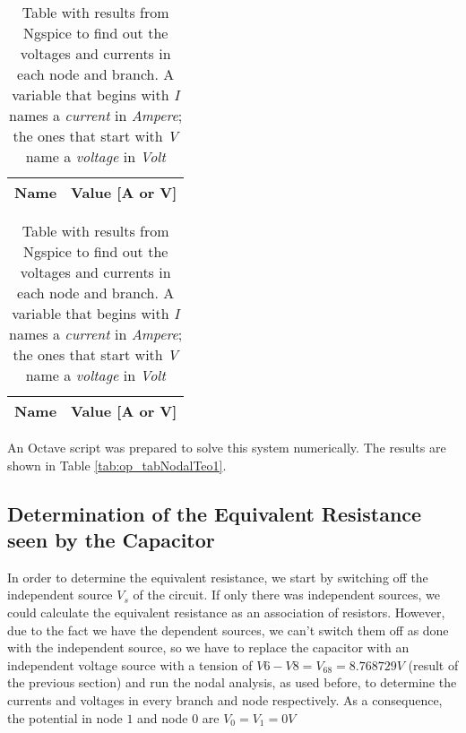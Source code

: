 \hfill

\begin{table}
  \parbox{.45\linewidth}{
    \centering
    \begin{tabular}{|c|c|}
      \hline
      {\bf Name} & {\bf Value [A or V]} \\ \hline
      
    \end{tabular}
    \label{tab:op_tabNodalTeo1}
    \caption{Results of Nodal Analysis of the circuit for t < 0. A variable that begins  with \textit{I} names a \textit{current} in \textit{Ampere}; the ones that start with \textit{V} name a \textit{voltage} in \textit{Volt}}
  }
  \hfill
  \parbox{.45\linewidth}{
    \centering
    \begin{tabular}{|c|c|}
      {\bf Name} & {\bf Value [A or V]} \\ \hline
      
      \hline
    \end{tabular}
    \label{tab:op_tabNodalSpice1}
    \caption{Table with results from Ngspice to find out the voltages and currents in each node and branch. A variable that begins  with \textit{I} names a \textit{current} in \textit{Ampere}; the ones that start with \textit{V} name a \textit{voltage} in \textit{Volt} }
  }
\end{table}



An Octave script was prepared to solve this system numerically. The results are shown in Table \ref{tab:op_tabNodalTeo1}.




\subsection{Determination of the Equivalent Resistance seen by the Capacitor}

In order to determine the equivalent resistance, we start by switching off the independent source $V_s$ of the circuit. If only there was independent sources, we could calculate the equivalent resistance
as an association of resistors. However, due to the fact we have the dependent sources, we can't switch them off as done with the independent source, so we have to replace the capacitor with an independent voltage source with a tension of $V6-V8 = V_{68} = 8.768729 V$ (result of the previous section)
and run the nodal analysis, as used before,
to determine the currents and voltages in every branch and node respectively. As a consequence, the potential in node $1$ and node $0$ are $V_0 = V_1 = 0 V$

